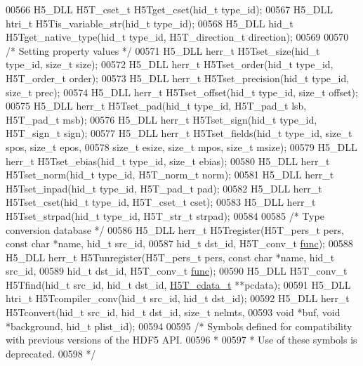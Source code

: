 \begin{DoxyCode}
00566 H5\_DLL H5T\_cset\_t H5Tget\_cset(hid\_t type\_id);
00567 H5\_DLL htri\_t H5Tis\_variable\_str(hid\_t type\_id);
00568 H5\_DLL hid\_t H5Tget\_native\_type(hid\_t type\_id, H5T\_direction\_t direction);
00569 
00570 \textcolor{comment}{/* Setting property values */}
00571 H5\_DLL herr\_t H5Tset\_size(hid\_t type\_id, \textcolor{keywordtype}{size\_t} size);
00572 H5\_DLL herr\_t H5Tset\_order(hid\_t type\_id, H5T\_order\_t order);
00573 H5\_DLL herr\_t H5Tset\_precision(hid\_t type\_id, \textcolor{keywordtype}{size\_t} prec);
00574 H5\_DLL herr\_t H5Tset\_offset(hid\_t type\_id, \textcolor{keywordtype}{size\_t} offset);
00575 H5\_DLL herr\_t H5Tset\_pad(hid\_t type\_id, H5T\_pad\_t lsb, H5T\_pad\_t msb);
00576 H5\_DLL herr\_t H5Tset\_sign(hid\_t type\_id, H5T\_sign\_t sign);
00577 H5\_DLL herr\_t H5Tset\_fields(hid\_t type\_id, \textcolor{keywordtype}{size\_t} spos, \textcolor{keywordtype}{size\_t} epos,
00578                  \textcolor{keywordtype}{size\_t} esize, \textcolor{keywordtype}{size\_t} mpos, \textcolor{keywordtype}{size\_t} msize);
00579 H5\_DLL herr\_t H5Tset\_ebias(hid\_t type\_id, \textcolor{keywordtype}{size\_t} ebias);
00580 H5\_DLL herr\_t H5Tset\_norm(hid\_t type\_id, H5T\_norm\_t norm);
00581 H5\_DLL herr\_t H5Tset\_inpad(hid\_t type\_id, H5T\_pad\_t pad);
00582 H5\_DLL herr\_t H5Tset\_cset(hid\_t type\_id, H5T\_cset\_t cset);
00583 H5\_DLL herr\_t H5Tset\_strpad(hid\_t type\_id, H5T\_str\_t strpad);
00584 
00585 \textcolor{comment}{/* Type conversion database */}
00586 H5\_DLL herr\_t H5Tregister(H5T\_pers\_t pers, \textcolor{keyword}{const} \textcolor{keywordtype}{char} *name, hid\_t src\_id,
00587                hid\_t dst\_id, H5T\_conv\_t \hyperlink{structfunc}{func});
00588 H5\_DLL herr\_t H5Tunregister(H5T\_pers\_t pers, \textcolor{keyword}{const} \textcolor{keywordtype}{char} *name, hid\_t src\_id,
00589                  hid\_t dst\_id, H5T\_conv\_t \hyperlink{structfunc}{func});
00590 H5\_DLL H5T\_conv\_t H5Tfind(hid\_t src\_id, hid\_t dst\_id, \hyperlink{struct_h5_t__cdata__t}{H5T\_cdata\_t} **pcdata);
00591 H5\_DLL htri\_t H5Tcompiler\_conv(hid\_t src\_id, hid\_t dst\_id);
00592 H5\_DLL herr\_t H5Tconvert(hid\_t src\_id, hid\_t dst\_id, \textcolor{keywordtype}{size\_t} nelmts,
00593               \textcolor{keywordtype}{void} *buf, \textcolor{keywordtype}{void} *background, hid\_t plist\_id);
00594 
00595 \textcolor{comment}{/* Symbols defined for compatibility with previous versions of the HDF5 API.}
00596 \textcolor{comment}{ *}
00597 \textcolor{comment}{ * Use of these symbols is deprecated.}
00598 \textcolor{comment}{ */}

\end{DoxyCode}
